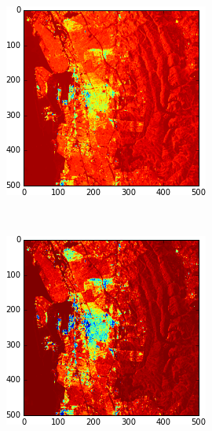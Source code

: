 \begin{figure}[!htb]
	\centering
	\begin{subfigure}[t]{0.31\columnwidth}
		\includegraphics[width = \columnwidth]{Figures/Rotation_FS/0deg_decode3_11}
		\caption{}
		\label{fig:0deg}
	\end{subfigure}%
	~ 
	\begin{subfigure}[t]{0.31\columnwidth}
		\includegraphics[width = \columnwidth]{Figures/Rotation_FS/5deg_decode3_11}

\end{subfigure}
\end{figure}
